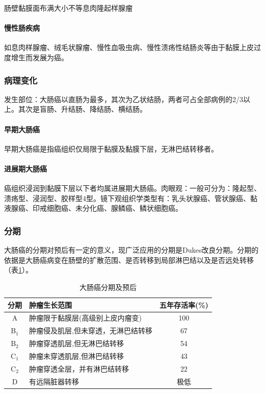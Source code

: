 {肠壁黏膜面布满大小不等息肉隆起样腺瘤}

\paragraph{慢性肠疾病}
如息肉样腺瘤、绒毛状腺瘤、慢性血吸虫病、慢性溃疡性结肠炎等由于黏膜上皮过度增生而发展为癌。

\subsubsection{病理变化}

发生部位：大肠癌以直肠为最多，其次为乙状结肠，两者可占全部病例的2/3以上。其次是盲肠、升结肠、降结肠、横结肠。

\paragraph{早期大肠癌}
早期大肠癌是指癌组织仅局限于黏膜及黏膜下层，无淋巴结转移者。

\paragraph{进展期大肠癌}
癌组织浸润到黏膜下层以下者均属进展期大肠癌。肉眼观：一般可分为：隆起型、溃疡型、浸润型、胶样型4型。镜下观组织学类型有：乳头状腺癌、管状腺癌、黏液腺癌、印戒细胞癌、未分化癌、腺鳞癌、鳞状细胞癌。

\subsubsection{分期}

大肠癌的分期对预后有一定的意义，现广泛应用的分期是Dukes改良分期。分期的依据是大肠癌病变在肠壁的扩散范围、是否转移到局部淋巴结以及是否远处转移（表\ref{tab8-2}）。

\begin{table}[ht]
    \caption{大肠癌分期及预后}
    \label{tab8-2}
    \centering
    \begin{tabular}{clc}
    \toprule
    分期&肿瘤生长范围&五年存活率(\%)\\
    \midrule
    A&肿瘤限于黏膜层(高级别上皮内瘤变)&100\\
    B$_1$&肿瘤侵及肌层,但未穿透，无淋巴结转移&67\\
    B$_2$&肿瘤穿透肌层,但无淋巴结转移&54\\
    C$_1$&肿瘤未穿透肌层,但淋巴结转移&43\\
    C$_2$&肿瘤穿透全层，并有淋巴结转移&22\\
    D&有远隔脏器转移&极低\\
    \bottomrule
    \end{tabular}
\end{table}

